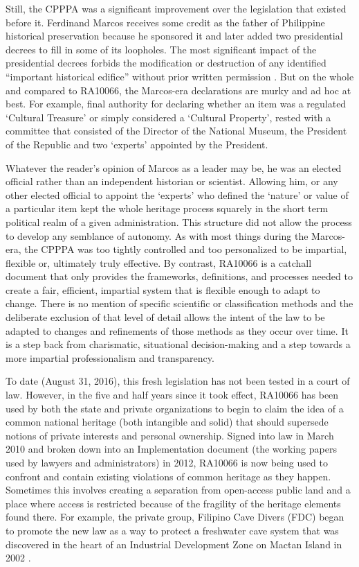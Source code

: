 \documentclass[english]{ijsra}
\begin{document}
Still, the CPPPA was a significant improvement over the legislation that existed before it. Ferdinand Marcos receives some credit as the father of Philippine historical preservation because he sponsored it and later added two presidential decrees \parencites{President_260}{President_1505} to fill in some of its loopholes. 
The most significant impact of the presidential decrees forbids the modification or destruction of any identified “important historical edifice” without prior written permission \parencite[2]{Tankersley_2014}. 
But on the whole and compared to RA10066, the Marcos-era declarations are murky and ad hoc at best. For example, final authority for declaring whether an item was a regulated ‘Cultural Treasure’ or simply considered a ‘Cultural Property’, rested with a committee that consisted of the Director of the National Museum, the President of the Republic and two ‘experts’ appointed by the President. 

Whatever the reader’s opinion of Marcos as a leader may be, he was an elected official rather than an independent historian or scientist. Allowing him, or any other elected official to appoint the ‘experts’ who defined the ‘nature’ or value of a particular item kept the whole heritage process squarely in the short term political realm of a given administration.  This structure did not allow the process to develop any semblance of autonomy. As with most things during the Marcos-era, the CPPPA was too tightly controlled and too personalized to be impartial, flexible or, ultimately truly effective. By contrast, RA10066 is a catchall document that only provides the frameworks, definitions, and processes needed to create a fair, efficient, impartial system that is flexible enough to adapt to change. There is no mention of specific scientific or classification methods and the deliberate exclusion of that level of detail allows the intent of the law to be adapted to changes and refinements of those methods as they occur over time. It is a step back from charismatic, situational decision-making and a step towards a more impartial professionalism and transparency.

To date (August 31, 2016), this fresh legislation has not been tested in a court of law. However, in the five and half years since it took effect, RA10066 has been used by both the state and private organizations to begin to claim the idea of a common national heritage (both intangible and solid) that should supersede notions of private interests and personal ownership. Signed into law in March 2010 and broken down into an Implementation document (the working papers used by lawyers and administrators) in 2012, RA10066 is now being used to confront and contain existing violations of common heritage as they happen. Sometimes this involves creating a separation from open-access public land and a place where access is restricted because of the fragility of the heritage elements found there. For example, the private group, Filipino Cave Divers (FDC) began to promote the new law as a way to protect a freshwater cave system that was discovered in the heart of an Industrial Development Zone on Mactan Island in 2002 \parencite{Divers_2014a}. 
\end{document}
